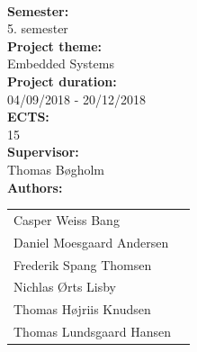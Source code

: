 \newpage
\makeatother
\begin{minipage}[T]{0.45\textwidth}
 \begin{flushleft}
  \textbf{\normalsize{}}\\ \maketitle
  \textbf{\normalsize{Semester:}}\\5. semester\\
  \textbf{\normalsize{Project theme:}}\\Embedded Systems\\
  \textbf{\normalsize{Project duration:}}\\04/09/2018 - 20/12/2018\\
  \textbf{\normalsize{ECTS:}}\\15\\
  \textbf{\normalsize{Supervisor:}}\\Thomas Bøgholm\\

  \textbf{\normalsize{Authors:}}\\
  \begin{tabular}{ll}
   \normalsize{Casper Weiss Bang}\\
   \normalsize{Daniel Moesgaard Andersen}\\
   \normalsize{Frederik Spang Thomsen}\\
   \normalsize{Nichlas Ørts Lisby}\\
   \normalsize{Thomas Højriis Knudsen}\\
   \normalsize{Thomas Lundsgaard Hansen}\\
  \end{tabular}
 \end{flushleft}
\end{minipage}
 ~
